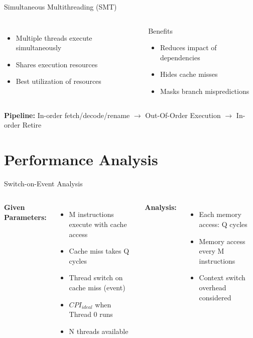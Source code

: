 \documentclass[aspectratio=169,12pt]{beamer}
\begin{document}
\begin{frame}{Simultaneous Multithreading (SMT)}
\begin{columns}
\begin{itemize}
    \item Multiple threads execute simultaneously
    \item Shares execution resources
    \item Best utilization of resources
\end{itemize}

\begin{block}{Benefits}
\begin{itemize}
    \item Reduces impact of dependencies
    \item Hides cache misses
    \item Masks branch mispredictions
\end{itemize}
\end{block}
\end{columns}

\vspace{0.5cm}
\begin{center}
\textbf{Pipeline:} In-order fetch/decode/rename $\rightarrow$ Out-Of-Order Execution $\rightarrow$ In-order Retire
\end{center}
\end{frame}

\section{Performance Analysis}

\begin{frame}{Switch-on-Event Analysis}
\begin{columns}
\textbf{Given Parameters:}
\begin{itemize}
    \item M instructions execute with cache access
    \item Cache miss takes Q cycles
    \item Thread switch on cache miss (event)
    \item $CPI_{ideal}$ when Thread 0 runs
    \item N threads available
\end{itemize}

\textbf{Analysis:}
\begin{itemize}
    \item Each memory access: Q cycles
    \item Memory access every M instructions
    \item Context switch overhead considered
\end{itemize}
\end{columns}
\end{frame}
\end{document}
